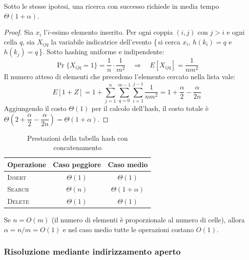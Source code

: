 \begin{teorema}
	Sotto le stesse ipotesi, una ricerca con successo richiede in media tempo
	$\Theta(1 + \alpha)$.
\end{teorema}

\begin{proof}
	Sia $x_i$ l'$i$-esimo elemento inserito. Per ogni coppia $(i,j)$ con $j > i$
	e ogni cella $q$, sia $X_{ijq}$ la variabile indicatrice dell'evento
	\{\,si cerca $x_i$, $h(k_i)=q$ e $h(k_j)=q$\,\}.
	Sotto hashing uniforme e indipendente:
	\[
	\Pr\{X_{ijq}=1\} = \frac{1}{n} \cdot \frac{1}{m^2}
	\quad\Rightarrow\quad E[X_{ijq}] = \frac{1}{nm^2}
	\]
	Il numero atteso di elementi che precedono l'elemento cercato nella lista
	vale:
	\[
	E[1 + Z]
	= 1 + \sum_{j=1}^{n}\sum_{q=0}^{m-1}\sum_{i=1}^{j-1} \frac{1}{nm^2}
	= 1 + \frac{\alpha}{2} - \frac{\alpha}{2n}
	\]
	Aggiungendo il costo $\Theta(1)$ per il calcolo dell'hash, il costo totale
	è $\Theta\!\left(2 + \dfrac{\alpha}{2} - \dfrac{\alpha}{2n}\right)
	= \Theta(1 + \alpha)$.
\end{proof}

\begin{table}[ht]
	\centering
	\caption{Prestazioni della tabella hash con concatenamento}
	\begin{tabular}{lcc}
		\toprule
		\textbf{Operazione} & \textbf{Caso peggiore} & \textbf{Caso medio}  \\
		\midrule
		\textsc{Insert}     & $\Theta(1)$             & $\Theta(1)$           \\
		\textsc{Search}     & $\Theta(n)$             & $\Theta(1 + \alpha)$  \\
		\textsc{Delete}     & $\Theta(1)$             & $\Theta(1)$           \\
		\bottomrule
	\end{tabular}
\end{table}

\begin{nota}
	Se $n = O(m)$ (il numero di elementi è proporzionale al numero di celle),
	allora $\alpha = n/m = O(1)$ e nel caso medio tutte le operazioni costano
	$O(1)$.
\end{nota}

\subsubsection{Risoluzione mediante indirizzamento aperto}

